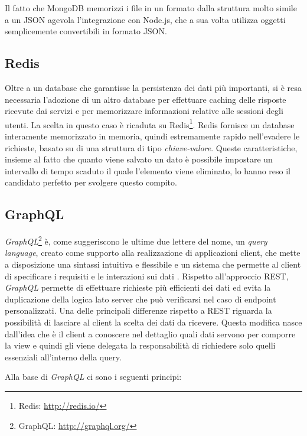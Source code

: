 Il fatto che MongoDB memorizzi i file in un formato dalla struttura molto simile a un JSON agevola l'integrazione con Node.js, che a sua volta utilizza oggetti semplicemente convertibili in formato JSON.

\subsection{Redis}

Oltre a un database che garantisse la persistenza dei dati più importanti, si è resa necessaria l'adozione di un altro database per effettuare  caching delle risposte ricevute dai servizi e per memorizzare informazioni relative alle sessioni degli utenti. La scelta in questo caso è ricaduta su Redis\footnote{Redis: \url{http://redis.io/}}. Redis fornisce un database interamente memorizzato in memoria, quindi estremamente rapido nell'evadere le richieste, basato su di una struttura di tipo \emph{chiave-valore}. Queste caratteristiche, insieme al fatto che quanto viene salvato un dato è possibile impostare un intervallo di tempo scaduto il quale l'elemento viene eliminato, lo hanno reso il candidato perfetto per svolgere questo compito.

\subsection{GraphQL\label{sec:graphql-introduzione}}

\emph{GraphQL}\footnote{GraphQL: \url{http://graphql.org/}} è, come suggeriscono le ultime due lettere del nome, un \emph{query language}, creato come supporto alla realizzazione di applicazioni client, che mette a disposizione una sintassi intuitiva e flessibile e un sistema che permette al client di specificare i requisiti e le interazioni sui dati \cite{website:graphql-specs}. Rispetto all'approccio REST, \emph{GraphQL} permette di effettuare richieste più efficienti dei dati ed evita la duplicazione della logica lato server che può verificarsi nel caso di endpoint personalizzati. Una delle principali differenze rispetto a REST riguarda la possibilità di lasciare al client la scelta dei dati da ricevere. Questa modifica nasce dall'idea che è il client a conoscere nel dettaglio quali dati servono per comporre la view e quindi gli viene delegata la responsabilità di richiedere solo quelli essenziali all'interno della query.

Alla base di \emph{GraphQL} ci sono i seguenti principi:

